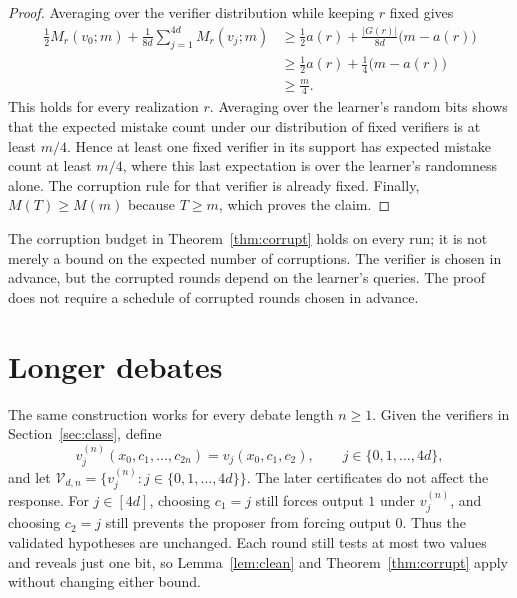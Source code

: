 \documentclass[11pt]{article}
\newcommand{\V}{\mathcal V}
\begin{document}
\begin{proof}
Averaging over the verifier distribution while keeping $r$ fixed gives
\begin{align*}
\frac12 M_r(v_0;m)+\frac{1}{8d}\sum_{j=1}^{4d}M_r(v_j;m)
&\ge\frac12 a(r)+\frac{|G(r)|}{8d}\bigl(m-a(r)\bigr)\\
&\ge\frac12 a(r)+\frac14\bigl(m-a(r)\bigr)\\
&\ge\frac m4.
\end{align*}
This holds for every realization $r$. Averaging over the learner's random
bits shows that the expected mistake count under our distribution of fixed
verifiers is at least $m/4$. Hence at least one fixed verifier in its
support has expected mistake count at least $m/4$, where this last
expectation is over the learner's randomness alone. The corruption rule
for that verifier is already fixed. Finally, $M(T)\ge M(m)$ because
$T\ge m$, which proves the claim.
\end{proof}

The corruption budget in Theorem~\ref{thm:corrupt} holds on every run; it
is not merely a bound on the expected number of corruptions. The verifier
is chosen in advance, but the corrupted rounds depend on the learner's
queries. The proof does not require a schedule of corrupted rounds chosen
in advance.

\section{Longer debates}\label{sec:longer}

The same construction works for every debate length $n\ge1$. Given the
verifiers in Section~\ref{sec:class}, define
\[
v_j^{(n)}(x_0,c_1,\ldots,c_{2n})=v_j(x_0,c_1,c_2),
\qquad j\in\{0,1,\ldots,4d\},
\]
and let $\V_{d,n}=\{v_j^{(n)}:j\in\{0,1,\ldots,4d\}\}$. The later
certificates do not affect the response. For $j\in[4d]$, choosing $c_1=j$ still forces
output $1$ under $v_j^{(n)}$, and choosing $c_2=j$ still prevents the
proposer from forcing output $0$. Thus the validated hypotheses are
unchanged. Each round still tests at most two values and reveals just one
bit, so Lemma~\ref{lem:clean} and Theorem~\ref{thm:corrupt} apply without
changing either bound.
\end{document}
